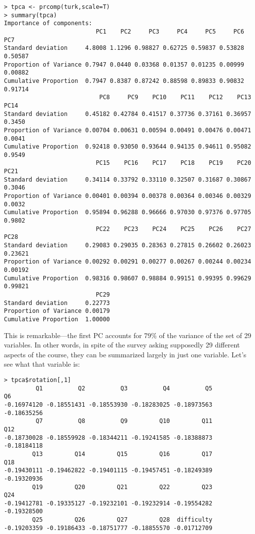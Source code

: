 \begin{lstlisting}
> tpca <- prcomp(turk,scale=T)
> summary(tpca)
Importance of components:
                          PC1    PC2     PC3     PC4     PC5     PC6
PC7
Standard deviation     4.8008 1.1296 0.98827 0.62725 0.59837 0.53828 0.50587
Proportion of Variance 0.7947 0.0440 0.03368 0.01357 0.01235 0.00999 0.00882
Cumulative Proportion  0.7947 0.8387 0.87242 0.88598 0.89833 0.90832 0.91714
                           PC8     PC9    PC10    PC11    PC12    PC13
PC14
Standard deviation     0.45182 0.42784 0.41517 0.37736 0.37161 0.36957 0.3450
Proportion of Variance 0.00704 0.00631 0.00594 0.00491 0.00476 0.00471 0.0041
Cumulative Proportion  0.92418 0.93050 0.93644 0.94135 0.94611 0.95082 0.9549
                          PC15    PC16    PC17    PC18    PC19    PC20
PC21
Standard deviation     0.34114 0.33792 0.33110 0.32507 0.31687 0.30867 0.3046
Proportion of Variance 0.00401 0.00394 0.00378 0.00364 0.00346 0.00329 0.0032
Cumulative Proportion  0.95894 0.96288 0.96666 0.97030 0.97376 0.97705 0.9802
                          PC22    PC23    PC24    PC25    PC26    PC27
PC28
Standard deviation     0.29083 0.29035 0.28363 0.27815 0.26602 0.26023 0.23621
Proportion of Variance 0.00292 0.00291 0.00277 0.00267 0.00244 0.00234 0.00192
Cumulative Proportion  0.98316 0.98607 0.98884 0.99151 0.99395 0.99629 0.99821
                          PC29
Standard deviation     0.22773
Proportion of Variance 0.00179
Cumulative Proportion  1.00000
\end{lstlisting}

This is remarkable---the first PC accounts for 79\% of the variance of
the set of 29 variables.  In other words, in spite of the survey asking
supposedly 29 different aspects of the course, they can be summarized
largely in just one variable.  Let's see what that variable is:

\begin{lstlisting}
> tpca$rotation[,1]
         Q1          Q2          Q3          Q4          Q5          Q6 
-0.16974120 -0.18551431 -0.18553930 -0.18283025 -0.18973563 -0.18635256 
         Q7          Q8          Q9         Q10         Q11         Q12 
-0.18730028 -0.18559928 -0.18344211 -0.19241585 -0.18388873 -0.18184118 
        Q13         Q14         Q15         Q16         Q17         Q18 
-0.19430111 -0.19462822 -0.19401115 -0.19457451 -0.18249389 -0.19320936 
        Q19         Q20         Q21         Q22         Q23         Q24 
-0.19412781 -0.19335127 -0.19232101 -0.19232914 -0.19554282 -0.19328500 
        Q25         Q26         Q27         Q28  difficulty 
-0.19203359 -0.19186433 -0.18751777 -0.18855570 -0.01712709 
\end{lstlisting}

